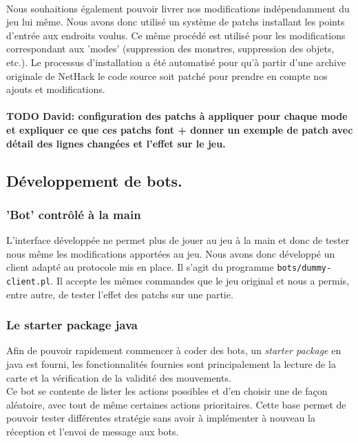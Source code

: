 \documentclass[a4paper,12pt]{article}
\begin{document}
\paragraph{} Nous souhaitions également pouvoir livrer nos modifications
indépendamment du jeu lui même. Nous avons donc utilisé un système de patchs
installant les points d'entrée aux endroits voulus. Ce même procédé est
utilisé pour les modifications correspondant aux 'modes' (suppression des
monstres, suppression des objets, etc.). Le processus d'installation a été
automatisé pour qu'à partir d'une archive originale de NetHack le code source
soit patché pour prendre en compte nos ajouts et modifications.

\paragraph{} 
\textbf{TODO David: configuration des patchs à appliquer pour chaque mode et
	expliquer ce que ces patchs font + donner un exemple de patch avec détail
	des lignes changées et l'effet sur le jeu.}



\subsection{Développement de bots.}

\subsubsection{'Bot' contrôlé à la main}

L'interface développée ne permet plus de jouer au jeu à la main et donc de
tester nous même les modifications apportées au jeu. Nous avons donc développé
un client adapté au protocole mis en place. Il s'agit du programme
\verb!bots/dummy-client.pl!. Il accepte les mêmes commandes que le jeu original et
nous a permis, entre autre, de tester l'effet des patchs sur une partie.


\subsubsection{Le starter package java}
Afin de pouvoir rapidement commencer à coder des bots, un \emph{starter package}
en java est fourni, les fonctionnalités fournies sont principalement la lecture
de la carte et la vérification de la validité des mouvements.
\\
Ce bot se contente de lister les actions possibles et d'en choisir une de façon
aléatoire, avec tout de même certaines actions prioritaires. Cette base permet
de pouvoir tester différentes stratégie sans avoir à implémenter à nouveau la
réception et l'envoi de message aux bots.
\end{document}

